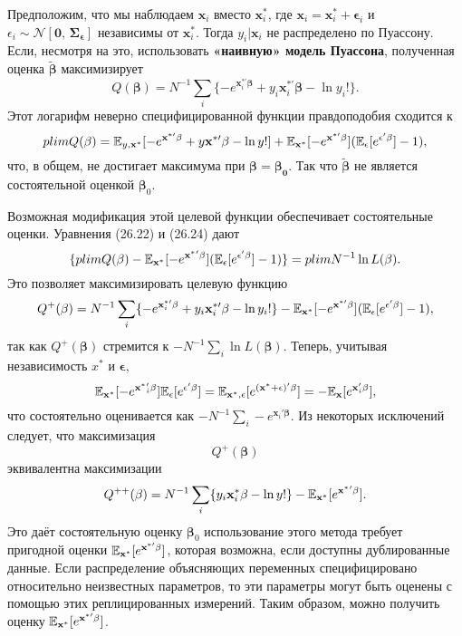 Предположим, что мы наблюдаем $\mathbf{x}_i$ вместо $\mathbf{x}^*_i$, где $\mathbf{x}_i=\mathbf{x}^*_i+\mathbf{\epsilon}_i$ и $\epsilon_i \sim \mathcal{N}[\mathbf{0}, \, \mathbf{\Sigma_{\epsilon}}]$ независимы от $\mathbf{x}^*_i$. Тогда $y_i| \mathbf{x}_i$ не распределено по Пуассону. Если, несмотря на это, использовать {\bf  «наивную» модель Пуассона}, полученная оценка $\mathbf{\tilde{\beta}}$ максимизирует
\begin{equation}
Q(\mathbf{\beta})= N^{-1} \sum \limits_i \{ -e^{\mathbf{x}^{*\prime}_i \mathbf{\beta}} + y_i \mathbf{x}^{*\prime}_i \mathbf{\beta} - \ln y_i! \}.
\end{equation}
Этот логарифм неверно специфицированной функции правдоподобия сходится к
\begin{equation}
plim Q(\mathbf{\beta})=\mathbb{E}_{y,\mathbf{x}^*}[-e^{\mathbf{x}^{*\prime} \mathbf{\beta}} + y \mathbf{x^{*\prime}} \mathbf{\beta} - \ln y! ] +  \mathbb{E}_{\mathbf{x^*}} [-e^{\mathbf{x^{*\prime}} \mathbf{\beta}}] (\mathbb{E}_{\epsilon}[e^{\mathbf{\epsilon}' \mathbf{\beta}}]-1),
\end{equation}
что, в общем, не достигает максимума при $\mathbf{\beta}= \mathbf{\beta_0}$. Так что $\mathbf{\tilde{\beta}}$ не является состоятельной оценкой $\mathbf{\beta}_0$.

Возможная модификация этой целевой функции обеспечивает состоятельные оценки. Уравнения (26.22) и (26.24) дают
\[
\{ plim Q(\mathbf{\beta})-\mathbb{E}_{\mathbf{x^*}} [-e^{\mathbf{x^*}' \mathbf{\beta}}](\mathbb{E}_{\epsilon}[e^{\mathbf{\epsilon}' \mathbf{\beta}}]-1) \} = plim N^{-1}\ln L(\mathbf{\beta}).
\]
Это позволяет максимизировать целевую функцию
\[
Q^+(\mathbf{\beta})=N^{-1} \sum \limits_i \{ -e^{\mathbf{x}^{*\prime}_i \mathbf{\beta}} + y_i \mathbf{x}^{*\prime}_i \mathbf{\beta} - \ln y_i! \} - \mathbb{E}_{\mathbf{x^*}} [-e^{\mathbf{x^{*\prime}} \mathbf{\beta}}](\mathbb{E}_{\epsilon}[e^{\mathbf{\epsilon}' \mathbf{\beta}}]-1),
\]
так как $Q^+(\mathbf{\beta})$ стремится к $-N^{-1} \sum \limits_i \ln L(\mathbf{\beta})$. Теперь, учитывая независимость $x^*$ и $\mathbf{\epsilon}$,
\[
\mathbb{E}_{\mathbf{x^*}}[ -e^{\mathbf{x^*}'_i \mathbf{\beta}}]\mathbb{E}_{\epsilon}[e^{\mathbf{\epsilon}' \mathbf{\beta}}] = \mathbb{E}_{\mathbf{x^*},\epsilon}[e^{(\mathbf{x^*}+\mathbf{\epsilon})' \mathbf{\beta}}]=-\mathbb{E}_{\mathbf{x}}[e^{\mathbf{x}'_i \mathbf{\beta}}],
\]
что состоятельно оценивается как $-N^{-1} \sum \limits_i -e^{\mathbf{x}_i' \mathbf{\beta}}$. Из некоторых исключений следует, что максимизация $$Q^+(\mathbf{\beta})$$ эквивалентна максимизации
\begin{equation}
Q^{++}(\mathbf{\beta})=N^{-1} \sum \limits_i \{ y_i \mathbf{x}^*_i \mathbf{\beta} - \ln y! \} - \mathbb{E}_{\mathbf{x^*}} [e^{\mathbf{x^*}' \mathbf{\beta}}].
\end{equation}
Это даёт состоятельную оценку $\mathbf{\beta}_0$ использование этого метода требует пригодной оценки $\mathbb{E}_{\mathbf{x}^*}[ e^{\mathbf{x}^{*\prime} \mathbf{\beta}}]$, которая возможна, если доступны дублированные данные. Если распределение объясняющих переменных специфицировано относительно неизвестных параметров, то эти параметры могут быть оценены с помощью этих реплицированных измерений. Таким образом, можно получить оценку $\mathbb{E}_{\mathbf{x}^*}[ e^{\mathbf{x}^{*\prime} \mathbf{\beta}}]$.


